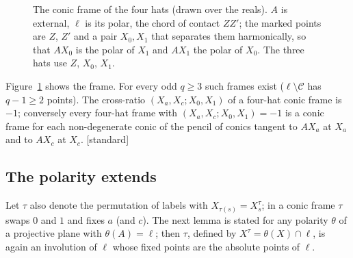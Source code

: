 \documentclass[11pt]{amsart}
\theoremstyle{definition}
\theoremstyle{remark}
\newcommand{\cC}{\mathcal{C}}
\newcommand{\status}[1]{\textup{[#1]}}
\begin{document}
\begin{figure}[ht]
\centering
{}
\caption{The conic frame of the four hats (drawn over the reals). $A$ is external, $\ell$ is its polar, the chord of
contact $ZZ'$; the marked points are $Z$, $Z'$ and a pair $X_0,X_1$ that separates them harmonically, so that
$AX_0$ is the polar of $X_1$ and $AX_1$ the polar of $X_0$. The three hats use $Z$, $X_0$, $X_1$.}
\label{fig:frame}
\end{figure}

Figure~\ref{fig:frame} shows the frame. For every odd $q\ge3$ such frames exist ($\ell\setminus\cC$ has $q-1\ge2$ points). The cross-ratio
$(X_a,X_c;X_0,X_1)$ of a four-hat conic frame is $-1$; conversely every four-hat frame with $(X_a,X_c;X_0,X_1)=-1$
is a conic frame for each non-degenerate conic of the pencil of conics tangent to $AX_a$ at $X_a$ and to $AX_c$ at $X_c$.
\status{standard}

\subsection{The polarity extends}
Let $\tau$ also denote the permutation of labels with $X_{\tau(s)}=X_s^\tau$; in a conic frame $\tau$ swaps $0$ and
$1$ and fixes $a$ (and $c$). The next lemma is stated for any polarity $\theta$ of a projective plane with
$\theta(A)=\ell$; then $\tau$, defined by $X^\tau=\theta(X)\cap\ell$, is again an involution of $\ell$ whose fixed
points are the absolute points of $\ell$.
\end{document}
